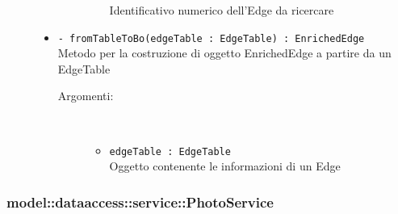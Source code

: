 \documentclass[../DefinizioneDiProdotto.tex]{subfiles}
\begin{document}
\begin{description}
\begin{itemize}
\begin{description}
\begin{itemize}
Identificativo numerico dell'Edge da ricercare\end{itemize}
\end{description}
\item \texttt{- fromTableToBo(edgeTable : EdgeTable) : EnrichedEdge}\\
Metodo per la costruzione di oggetto EnrichedEdge a partire da un EdgeTable
 \begin{description}
\item[Argomenti:] \
\begin{itemize}
\item \texttt{edgeTable : EdgeTable}\\
Oggetto contenente le informazioni di un Edge\end{itemize}
\end{description}
\end{itemize}
\end{description}

\subsubsection{model::dataaccess::service::PhotoService}
\end{document}
